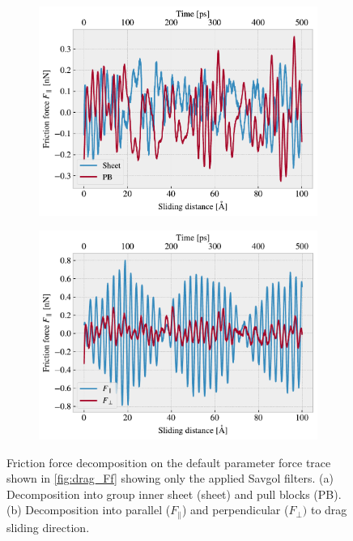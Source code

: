\begin{figure}[H]
  \centering
  \begin{subfigure}[t]{0.49\textwidth}
    \centering
    \includegraphics[width=\textwidth]{figures/baseline/decomp_group.pdf}
    \caption{}
    \label{fig:decomp_group}
  \end{subfigure}
  \hfill
  \begin{subfigure}[t]{0.49\textwidth}
      \centering
      \includegraphics[width=\textwidth]{figures/baseline/decomp_direc.pdf}
      \caption{}
      \label{fig:decomp_direc}
  \end{subfigure}
  \caption{Friction force decomposition on the default parameter force trace shown in \cref{fig:drag_Ff} showing only the applied Savgol filters. (a) Decomposition into group inner sheet (sheet) and pull blocks (PB). (b) Decomposition into parallel ($F_{\parallel}$) and perpendicular ($F_{\perp})$ to drag sliding direction.}
  \label{fig:decomp}
\end{figure}


